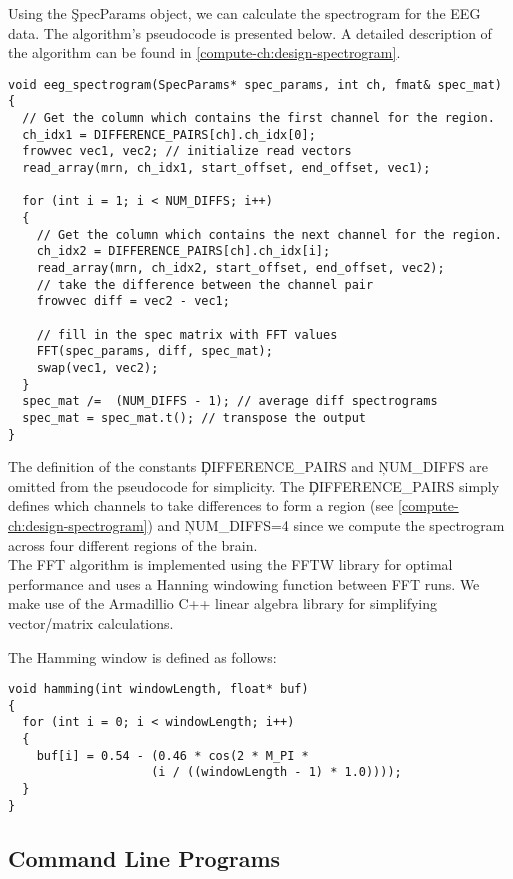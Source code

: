 Using the \c{SpecParams} object, we can calculate the spectrogram for the EEG
data. The algorithm's pseudocode is presented below. A detailed description of
the algorithm can be found in \ref{compute-ch:design-spectrogram}.

\begin{lstlisting}
void eeg_spectrogram(SpecParams* spec_params, int ch, fmat& spec_mat)
{
  // Get the column which contains the first channel for the region.
  ch_idx1 = DIFFERENCE_PAIRS[ch].ch_idx[0];
  frowvec vec1, vec2; // initialize read vectors
  read_array(mrn, ch_idx1, start_offset, end_offset, vec1);

  for (int i = 1; i < NUM_DIFFS; i++)
  {
    // Get the column which contains the next channel for the region.
    ch_idx2 = DIFFERENCE_PAIRS[ch].ch_idx[i];
    read_array(mrn, ch_idx2, start_offset, end_offset, vec2);
    // take the difference between the channel pair
    frowvec diff = vec2 - vec1;

    // fill in the spec matrix with FFT values
    FFT(spec_params, diff, spec_mat);
    swap(vec1, vec2);
  }
  spec_mat /=  (NUM_DIFFS - 1); // average diff spectrograms
  spec_mat = spec_mat.t(); // transpose the output
}
\end{lstlisting}

The definition of the constants \c{DIFFERENCE\_PAIRS} and \c{NUM\_DIFFS} are
omitted from the pseudocode for simplicity. The \c{DIFFERENCE\_PAIRS} simply
defines which channels to take differences to form a region (see
\ref{compute-ch:design-spectrogram}) and \c{NUM\_DIFFS=4} since we compute the
spectrogram across four different regions of the brain. \\

The FFT algorithm is implemented using the FFTW library \cite{fftw} for optimal
performance and uses a Hanning windowing function between FFT runs. We make use
of the Armadillio C++ linear algebra library \cite{arma} for simplifying
vector/matrix calculations.

The Hamming window is defined as follows:

\begin{lstlisting}
void hamming(int windowLength, float* buf)
{
  for (int i = 0; i < windowLength; i++)
  {
    buf[i] = 0.54 - (0.46 * cos(2 * M_PI *
                    (i / ((windowLength - 1) * 1.0))));
  }
}
\end{lstlisting}

\subsection{Command Line Programs}\label{compute-ch:implementation-cmd}

